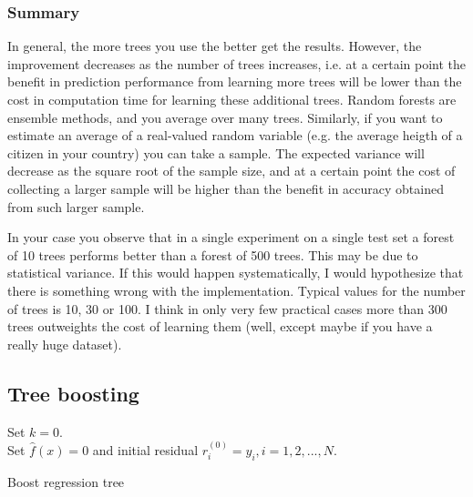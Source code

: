\begin{refsection}
\subsubsection{Summary}


\begin{remark}
	In general, the more trees you use the better get the results. However, the improvement decreases as the number of trees increases, i.e. at a certain point the benefit in prediction performance from learning more trees will be lower than the cost in computation time for learning these additional trees.
	Random forests are ensemble methods, and you average over many trees. Similarly, if you want to estimate an average of a real-valued random variable (e.g. the average heigth of a citizen in your country) you can take a sample. The expected variance will decrease as the square root of the sample size, and at a certain point the cost of collecting a larger sample will be higher than the benefit in accuracy obtained from such larger sample.
	
	In your case you observe that in a single experiment on a single test set a forest of 10 trees performs better than a forest of 500 trees. This may be due to statistical variance. If this would happen systematically, I would hypothesize that there is something wrong with the implementation.
	Typical values for the number of trees is 10, 30 or 100. I think in only very few practical cases more than 300 trees outweights the cost of learning them (well, except maybe if you have a really huge dataset).	
\end{remark}





\subsection{Tree boosting}



\begin{algorithm}[H]
	\SetAlgoLined
	Set $k = 0$. \\
	Set $\hat{f}(x) = 0$ and initial residual $r_i^{(0)} = y_i, i=1,2,...,N$.
	\caption{Boost regression tree}
\end{algorithm}



\end{refsection}
